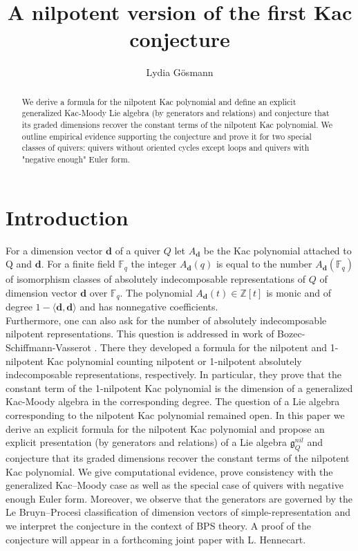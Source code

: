 \documentclass{article}
\title{A nilpotent version of the first Kac conjecture}
\author{Lydia Gösmann}
\date{}
\newcommand{\bd}{\mathbf{d}}
\begin{document}
\maketitle

\begin{abstract}
  We derive a formula for the nilpotent Kac polynomial and define an explicit generalized Kac-Moody Lie algebra (by generators and relations) and conjecture that its graded dimensions recover the constant terms of the nilpotent Kac polynomial. We outline empirical evidence supporting the conjecture and prove it for two special classes of quivers: quivers without oriented cycles except loops and quivers with "negative enough" Euler form.
\end{abstract}

\section{Introduction}
For a dimension vector $\bd$ of a quiver $Q$ let $A_{\bd}$ be the Kac polynomial attached to Q and $\bd$. For a finite field $\mathbb{F}_q$ the integer $A_{\bd}(q)$ is equal to the number $A_{\bd}(\mathbb{F}_q)$ of isomorphism classes of absolutely indecomposable representations of $Q$ of dimension vector $\bd$ over $\mathbb{F}_q$. The polynomial $A_{\bd}(t) \in \mathbb{Z}[t]$ is monic and of degree $1-\langle \bd, \bd \rangle$ and has nonnegative coefficients. \\
Furthermore, one can also ask for the number of absolutely indecomposable nilpotent representations. This question is addressed in work of Bozec-Schiffmann-Vasserot \cite{pointsnilpotentvarities}. There they developed a formula for the nilpotent and 1-nilpotent Kac polynomial counting nilpotent or 1-nilpotent absolutely indecomposable representations, respectively. In particular, they prove that the constant term of the 1-nilpotent Kac polynomial is the dimension of a generalized Kac-Moody algebra in the corresponding degree. The question of a Lie algebra corresponding to the nilpotent Kac polynomial remained open. In this paper we derive an explicit formula for the nilpotent Kac polynomial and propose an explicit presentation (by generators and relations) of a Lie algebra $\mathfrak{g}_Q^{nil}$ and conjecture that its graded dimensions recover the constant terms of the nilpotent Kac polynomial. We give computational evidence, prove consistency with the generalized Kac–Moody case as well as the special case of quivers with negative enough Euler form. Moreover, we observe that the generators are governed by the Le Bruyn–Procesi classification of dimension vectors of simple-representation and we interpret the conjecture in the context of BPS theory. A proof of the conjecture will appear in a forthcoming joint paper with L. Hennecart.
\end{document}
